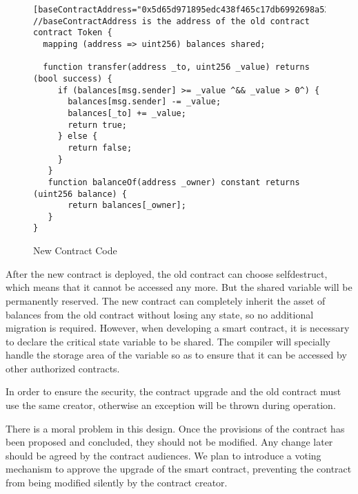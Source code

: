 	\begin{figure}[!h]
  	\centering
  	\begin{minipage}{0.95\linewidth}
	\begin{lstlisting}[frame=single]
[baseContractAddress="0x5d65d971895edc438f465c17db6992698a52318d"]
//baseContractAddress is the address of the old contract
contract Token {
  mapping (address => uint256) balances shared;

  function transfer(address _to, uint256 _value) returns (bool success) {
     if (balances[msg.sender] >= _value ^&& _value > 0^) {
       balances[msg.sender] -= _value;
       balances[_to] += _value;
       return true;
     } else {
       return false;
     }
   }
   function balanceOf(address _owner) constant returns (uint256 balance) {
       return balances[_owner];
   }
}
	\end{lstlisting}
  	\end{minipage}
  	\caption{New Contract Code}
  	\label{figure:nf:newsc}
	\end{figure}

After the new contract is deployed, the old contract can choose selfdestruct, which means that it cannot be accessed any more. But the shared variable will be permanently reserved. The new contract can completely inherit the asset of balances from the old contract without losing any state, so no additional migration is required. However, when developing a smart contract, it is necessary to declare the critical state variable to be shared. The compiler will specially handle the storage area of the variable so as to ensure that it can be accessed by other authorized contracts.


In order to ensure the security, the contract upgrade and the old contract must use the same creator, otherwise an exception will be thrown during operation. 


There is a moral problem in this design. Once the provisions of the contract has been proposed and concluded, they should not be modified. Any change later should be agreed by the contract audiences. We plan to introduce a voting mechanism to approve the upgrade of the smart contract, preventing the contract from being modified silently by the contract creator. 


